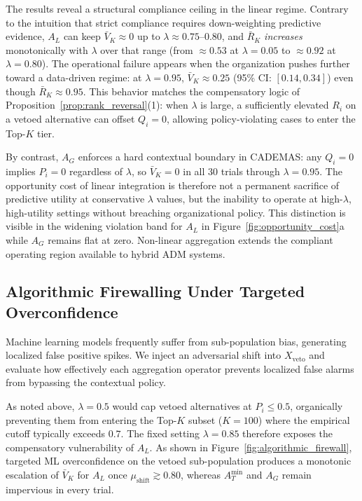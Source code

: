 \documentclass[mathematics,article,submit,moreauthors]{Definitions/mdpi}
\begin{document}
The results reveal a structural compliance ceiling in the linear regime. Contrary to the intuition that strict compliance requires down-weighting predictive evidence, $A_L$ can keep $\bar{V}_K \approx 0$ up to $\lambda \approx 0.75$--$0.80$, and $\bar{R}_K$ \emph{increases} monotonically with $\lambda$ over that range (from $\approx 0.53$ at $\lambda = 0.05$ to $\approx 0.92$ at $\lambda = 0.80$). The operational failure appears when the organization pushes further toward a data-driven regime: at $\lambda = 0.95$, $\bar{V}_K \approx 0.25$ (95\% CI: $[0.14, 0.34]$) even though $\bar{R}_K \approx 0.95$. This behavior matches the compensatory logic of Proposition~\ref{prop:rank_reversal}(1): when $\lambda$ is large, a sufficiently elevated $R_i$ on a vetoed alternative can offset $Q_i = 0$, allowing policy-violating cases to enter the Top-$K$ tier.

By contrast, $A_G$ enforces a hard contextual boundary in CADEMAS: any $Q_i = 0$ implies $P_i = 0$ regardless of $\lambda$, so $\bar{V}_K = 0$ in all 30 trials through $\lambda = 0.95$. The opportunity cost of linear integration is therefore not a permanent sacrifice of predictive utility at conservative $\lambda$ values, but the inability to operate at high-$\lambda$, high-utility settings without breaching organizational policy. This distinction is visible in the widening violation band for $A_L$ in Figure~\ref{fig:opportunity_cost}a while $A_G$ remains flat at zero. Non-linear aggregation extends the compliant operating region available to hybrid ADM systems.

\subsection{Algorithmic Firewalling Under Targeted Overconfidence}\label{subsect:firewall}

Machine learning models frequently suffer from sub-population bias, generating localized false positive spikes. We inject an adversarial shift into $X_{\text{veto}}$ and evaluate how effectively each aggregation operator prevents localized false alarms from bypassing the contextual policy.

As noted above, $\lambda = 0.5$ would cap vetoed alternatives at $P_i \leq 0.5$, organically preventing them from entering the Top-$K$ subset ($K=100$) where the empirical cutoff typically exceeds $0.7$. The fixed setting $\lambda = 0.85$ therefore exposes the compensatory vulnerability of $A_L$. As shown in Figure~\ref{fig:algorithmic_firewall}, targeted ML overconfidence on the vetoed sub-population produces a monotonic escalation of $\bar{V}_K$ for $A_L$ once $\mu_{\text{shift}} \gtrsim 0.80$, whereas $A_T^{\min}$ and $A_G$ remain impervious in every trial.
\end{document}
